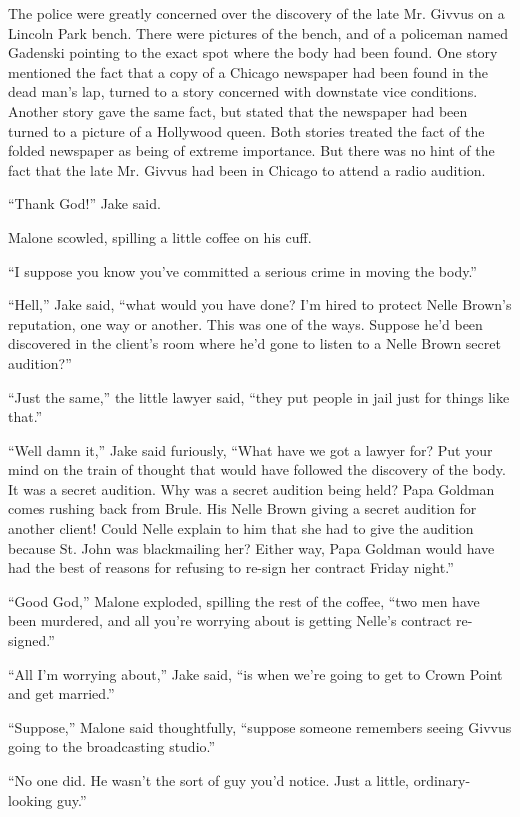 \documentclass{novel}
\begin{document}
The police were greatly concerned over the discovery of the late Mr. Givvus on a Lincoln Park bench. There were pictures of the bench, and of a policeman named Gadenski pointing to the exact spot where the body had been found. One story mentioned the fact that a copy of a Chicago newspaper had been found in the dead man’s lap, turned to a story concerned with downstate vice conditions. Another story gave the same fact, but stated that the newspaper had been turned to a picture of a Hollywood queen. Both stories treated the fact of the folded newspaper as being of extreme importance. But there was no hint of the fact that the late Mr. Givvus had been in Chicago to attend a radio audition.

“Thank God!” Jake said.

Malone scowled, spilling a little coffee on his cuff.

“I suppose you know you’ve committed a serious crime in moving the body.”

“Hell,” Jake said, “what would you have done? I’m hired to protect Nelle Brown’s reputation, one way or another. This was one of the ways. Suppose he’d been discovered in the client’s room where he’d gone to listen to a Nelle Brown secret audition?”

“Just the same,” the little lawyer said, “they put people in jail just for things like that.”

“Well damn it,” Jake said furiously, “What have we got a lawyer for? Put your mind on the train of thought that would have followed the discovery of the body. It was a secret audition. Why was a secret audition being held? Papa Goldman comes rushing back from Brule. His Nelle Brown giving a secret audition for another client! Could Nelle explain to him that she had to give the audition because St. John was blackmailing her? Either way, Papa Goldman would have had the best of reasons for refusing to re-sign her contract Friday night.”

“Good God,” Malone exploded, spilling the rest of the coffee, “two men have been murdered, and all you’re worrying about is getting Nelle’s contract re-signed.”

“All I’m worrying about,” Jake said, “is when we’re going to get to Crown Point and get married.”

“Suppose,” Malone said thoughtfully, “suppose someone remembers seeing Givvus going to the broadcasting studio.”

“No one did. He wasn’t the sort of guy you’d notice. Just a little, ordinary-looking guy.”
\end{document}

